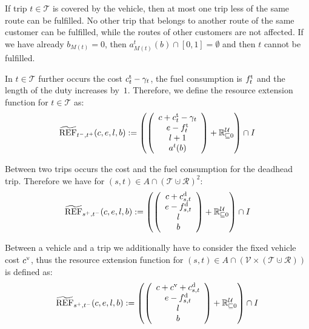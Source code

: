 If trip ${t\in\mathcal{T}}$ is covered by the vehicle, then at most one trip less of the same route can be fulfilled. No other trip that belongs to another route of the same customer can be fulfilled, while the routes of other customers are not affected. If we have already ${b_{M(t)}=0}$, then ${a^t_{M(t)}(b)\cap [0,1] = \emptyset}$ and then $t$ cannot be fulfilled.

In ${t\in\mathcal{T}}$ further occurs the cost ${c^{\operatorname{t}}_t-\gamma_t}$, the fuel consumption is $f^{\operatorname{t}}_t$ and the length of the duty increases by~$1$. Therefore, we define the resource extension function for $t\in\mathcal{T}$ as:
\begin{align}
	\widetilde{\operatorname{REF}}_{t^-,t^+}(c,e,l,b) := \left(\left(
	\begin{array}{c}
		c+c^{\operatorname{t}}_t-\gamma_t \\ e-f^{\operatorname{t}}_t \\ l+1 \\ a^t(b)
	\end{array}
	\right) + \mathbb{R}^{\mathcal{U}}_{\sqsubseteq 0}\right) \cap I \label{eq:ref_trip}
\end{align}

Between two trips occurs the cost and the fuel consumption for the deadhead trip. Therefore we have for ${(s,t)\in A\cap\left(\mathcal{T}\cupdot\mathcal{R}\right)^2}$:
\begin{align*}
	\widetilde{\operatorname{REF}}_{s^+,t^-}(c,e,l,b) := \left(\left(
	\begin{array}{c}
		c + c^{\operatorname{d}}_{s,t} \\ e-f^{\operatorname{d}}_{s,t} \\ l \\ b
	\end{array}
	\right) + \mathbb{R}^{\mathcal{U}}_{\sqsubseteq 0}\right) \cap I
\end{align*}

Between a vehicle and a trip we additionally have to consider the fixed vehicle cost $c^{\operatorname{v}}$, thus the resource extension function for ${(s,t)\in A\cap\left(\mathcal{V}\times\left(\mathcal{T}\cupdot\mathcal{R}\right)\right)}$ is defined as:
\begin{align*}
	\widetilde{\operatorname{REF}}_{s^+,t^-}(c,e,l,b) := \left(\left(
	\begin{array}{c}
		c + c^{\operatorname{v}} + c^{\operatorname{d}}_{s,t} \\ e-f^{\operatorname{d}}_{s,t} \\ l \\ b
	\end{array}
	\right) + \mathbb{R}^{\mathcal{U}}_{\sqsubseteq 0}\right) \cap I
\end{align*}

